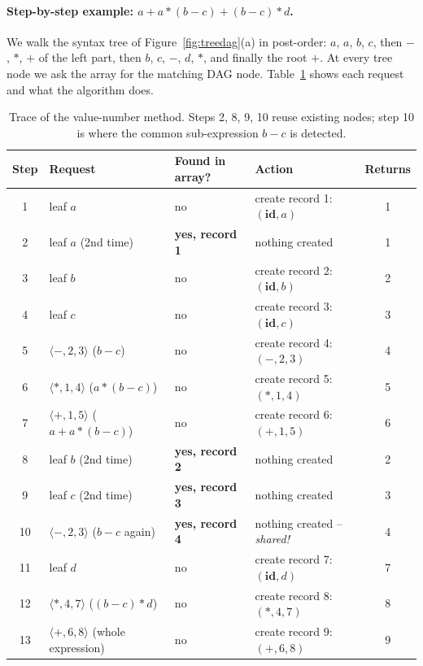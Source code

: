 \documentclass[11pt,a4paper]{article}
\begin{document}
\paragraph{Step-by-step example: $a + a*(b-c) + (b-c)*d$.}
We walk the syntax tree of Figure~\ref{fig:treedag}(a) in post-order: $a$, $a$, $b$, $c$, then $-$, $*$, $+$ of the left part, then $b$, $c$, $-$, $d$, $*$, and finally the root $+$. At every tree node we ask the array for the matching DAG node. Table~\ref{tab:vntrace} shows each request and what the algorithm does.

\begin{table}[H]
\centering
\small
\begin{tabular}{@{}c l l l c@{}}
\toprule
\textbf{Step} & \textbf{Request} & \textbf{Found in array?} & \textbf{Action} & \textbf{Returns} \\ \midrule
1 & leaf $a$ & no & create record 1: $(\mathbf{id}, a)$ & 1 \\
2 & leaf $a$ (2nd time) & \textbf{yes, record 1} & nothing created & 1 \\
3 & leaf $b$ & no & create record 2: $(\mathbf{id}, b)$ & 2 \\
4 & leaf $c$ & no & create record 3: $(\mathbf{id}, c)$ & 3 \\
5 & $\langle -, 2, 3\rangle$ \quad ($b-c$) & no & create record 4: $(-,2,3)$ & 4 \\
6 & $\langle *, 1, 4\rangle$ \quad ($a*(b-c)$) & no & create record 5: $(*,1,4)$ & 5 \\
7 & $\langle +, 1, 5\rangle$ \quad ($a + a*(b-c)$) & no & create record 6: $(+,1,5)$ & 6 \\
8 & leaf $b$ (2nd time) & \textbf{yes, record 2} & nothing created & 2 \\
9 & leaf $c$ (2nd time) & \textbf{yes, record 3} & nothing created & 3 \\
10 & $\langle -, 2, 3\rangle$ \quad ($b-c$ again) & \textbf{yes, record 4} & nothing created -- \emph{shared!} & 4 \\
11 & leaf $d$ & no & create record 7: $(\mathbf{id}, d)$ & 7 \\
12 & $\langle *, 4, 7\rangle$ \quad ($(b-c)*d$) & no & create record 8: $(*,4,7)$ & 8 \\
13 & $\langle +, 6, 8\rangle$ \quad (whole expression) & no & create record 9: $(+,6,8)$ & 9 \\ \bottomrule
\end{tabular}
\caption{Trace of the value-number method. Steps 2, 8, 9, 10 reuse existing nodes; step 10 is where the common sub-expression $b-c$ is detected.}
\label{tab:vntrace}
\end{table}
\end{document}
